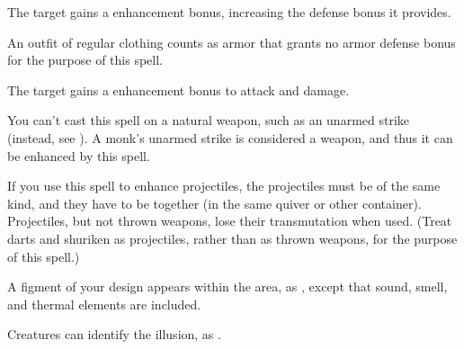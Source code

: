 \begin{spellheader}
    \spellrng{\rngclose}
    \spelldur{\durmed}
\end{spellheader}
\begin{spelleffects}
    \spelleffect The target gains a  enhancement bonus, increasing the defense bonus it provides. \spellbonusscalingdescription
\end{spelleffects}
\begin{spellfooter}
    \spellnotes An outfit of regular clothing counts as armor that grants no armor defense bonus for the purpose of this spell.
\end{spellfooter}

\begin{spellheader}
    \spellrng{\rngclose}
    \spelldur{\durshort}
\end{spellheader}
\begin{spelleffects}
    \spelleffect The target gains a  enhancement bonus to attack and damage. \spellbonusscalingdescription
\end{spelleffects}
\begin{spellfooter}
    \spellnotes You can't cast this spell on a natural weapon, such as an unarmed strike (instead, see ). A monk's unarmed strike is considered a weapon, and thus it can be enhanced by this spell.
    \par If you use this spell to enhance projectiles, the projectiles must be of the same kind, and they have to be together (in the same quiver or other container). Projectiles, but not thrown weapons, lose their transmutation when used. (Treat darts and shuriken as projectiles, rather than as thrown weapons, for the purpose of this spell.)
\end{spellfooter}

\begin{spellheader}
    \spelldur{\durshort}
\end{spellheader}
\begin{spelleffects}
    \spelleffect A figment of your design appears within the area, as , except that sound, smell, and thermal elements are included.
\end{spelleffects}
\begin{spellfooter}
    \spellnotes Creatures can identify the illusion, as .
\end{spellfooter}

